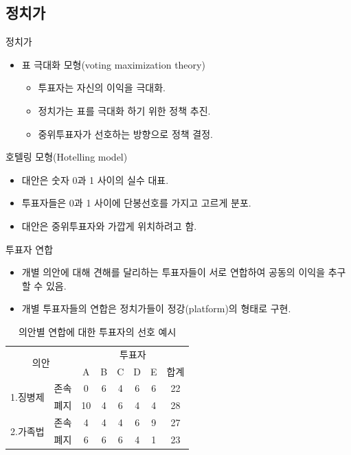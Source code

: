 \documentclass[aspectratio=169,xcolor=dvipsnames,handout]{beamer}
\begin{document}
\subsection{정치가}

\begin{frame}{정치가}
    \begin{itemize}
        \item 표 극대화 모형(voting maximization theory)
        \begin{itemize}
            \item 투표자는 자신의 이익을 극대화.
            \item 정치가는 표를 극대화 하기 위한 정책 추진.
            \item 중위투표자가 선호하는 방향으로 정책 결정.
        \end{itemize}
    \end{itemize}
\end{frame}
\begin{frame}{호텔링 모형(Hotelling model)}
    \begin{itemize}
        \item 대안은 숫자 0과 1 사이의 실수 대표. 
        \item 투표자들은 0과 1 사이에 단봉선호를 가지고 고르게 분포.
        \item 대안은 중위투표자와 가깝게 위치하려고 함.
    \end{itemize}
\end{frame}

\begin{frame}{투표자 연합}
    \begin{itemize}[<+->]
        \item 개별 의안에 대해 견해를 달리하는 투표자들이 서로 연합하여 공동의 이익을 추구할 수 있음.
        \item 개별 투표자들의 연합은 정치가들이 정강(platform)의 형태로 구현.
    \end{itemize}
    \pause
    \begin{table}
        \centering
        \begin{tabular}{cc|c|c|c|c|c|c}
            \toprule
            \multicolumn{2}{c|}{\multirow{2}{*}{의안}} & \multicolumn{6}{c}{투표자} \\
                     \cline{3-8} & & A & B & C & D & E & 합계 \\
            \hline \multirow{2}{*}{1.징병제} & 존속 & 0 & 6 & 4 & 6 & 6 & 22  \\
                     & 폐지 & 10 & 4 & 6 & 4 & 4 & 28  \\
            \hline \multirow{2}{*}{2.가족법} & 존속 & 4 & 4 & 4 & 6 & 9 & 27  \\
                     & 폐지 & 6 & 6 & 6 & 4 & 1 & 23  \\
            \bottomrule
        \end{tabular}
        \caption{의안별 연합에 대한 투표자의 선호 예시}
    \end{table}
\end{frame}
\end{document}
